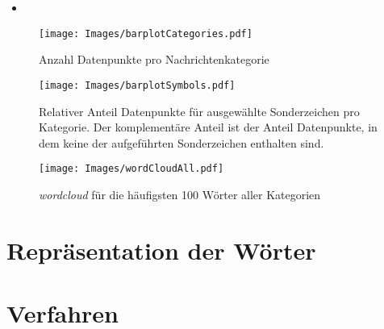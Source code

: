 \documentclass[10pt, xcolor = dvipsnames]{beamer}
\begin{document}
\begin{frame}{\insertsection}

   \begin{itemize}
   \item 
   \end{itemize}
 
   
\end{frame}   





\begin{frame}

\begin{figure}[ht]
    \centering
\texttt{[image: Images/barplotCategories.pdf]} 
\caption{Anzahl Datenpunkte pro Nachrichtenkategorie}
\label{abb:barplotCategories}
\end{figure}

\end{frame}


\begin{frame}

\begin{figure}[ht]
    \centering
\texttt{[image: Images/barplotSymbols.pdf]} 
\caption{Relativer Anteil Datenpunkte für ausgewählte Sonderzeichen pro Kategorie. Der komplementäre Anteil ist der Anteil Datenpunkte, in dem keine der aufgeführten Sonderzeichen enthalten sind.}
\label{abb:barplotSymbols}
\end{figure}

\end{frame}


\begin{frame}
\begin{figure}[ht]
    \centering
\texttt{[image: Images/wordCloudAll.pdf]} 
\caption{\textit{wordcloud} für die häufigsten 100 Wörter aller Kategorien}
\label{abb:WordcloudAll}
\end{figure}
\end{frame}


\section{Repräsentation der Wörter}

\section{Verfahren}
\end{document}
